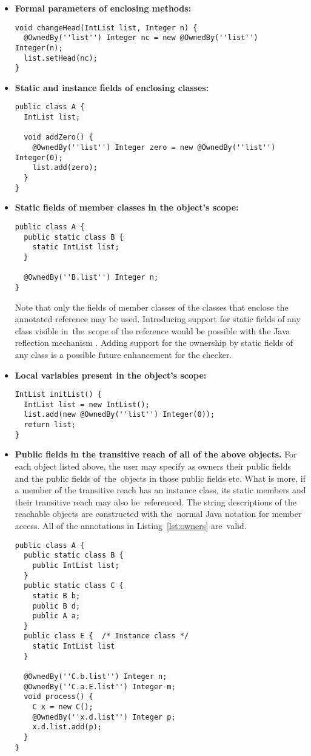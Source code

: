 \documentclass{pracamgr}
\theoremstyle{break}
\theoremstyle{break}
\theoremstyle{break}
\begin{document}
\begin{itemize}
\item \textbf{Formal parameters of enclosing methods:}
  \begin{lstlisting}
void changeHead(IntList list, Integer n) {
  @OwnedBy(''list'') Integer nc = new @OwnedBy(''list'') Integer(n);
  list.setHead(nc);
}
  \end{lstlisting}
\item \textbf{Static and instance fields of enclosing classes:}
  \begin{lstlisting}
public class A {
  IntList list;

  void addZero() {
    @OwnedBy(''list'') Integer zero = new @OwnedBy(''list'') Integer(0);
    list.add(zero);
  }
}
\end{lstlisting}
\item \textbf{Static fields of member classes in the object's scope:}
  \begin{lstlisting}
public class A {
  public static class B {
    static IntList list;
  }

  @OwnedBy(''B.list'') Integer n;
}
\end{lstlisting}
Note that only the fields of member classes of the classes that
enclose the annotated re\-fe\-ren\-ce may be used. Introducing support
for static fields of any class visible in~the~scope of the reference
would be possible with the Java reflection mechanism
\cite{reflection}. Adding support for the ownership by static fields
of any class is a possible future enhancement for the checker.
\item \textbf{Local variables present in the object's scope:}
\begin{lstlisting}
IntList initList() {
  IntList list = new IntList();
  list.add(new @OwnedBy(''list'') Integer(0)); 
  return list;
}
\end{lstlisting}
\item \textbf{Public fields in the transitive reach of all of the
  above objects.} For each object listed above, the user may specify
  as owners their public fields and the public fields of~the~objects
  in those public fields etc. What is more, if a member of the
  transitive reach has an instance class, its static members and their
  transitive reach may also be~referenced. The string descriptions of
  the reachable objects are constructed with the~normal Java notation
  for member access. All of the annotations in
  Listing~\ref{lst:owners} are~valid.
  \begin{lstlisting}[label={lst:owners}, 
      caption={\texttt{@OwnedBy} specifications}]
public class A {
  public static class B {
    public IntList list;
  }
  public static class C {
    static B b;
    public B d;
    public A a;
  }
  public class E {  /* Instance class */
    static IntList list
  }
  
  @OwnedBy(''C.b.list'') Integer n;   
  @OwnedBy(''C.a.E.list'') Integer m; 
  void process() {
    C x = new C();
    @OwnedBy(''x.d.list'') Integer p;
    x.d.list.add(p);
  }  
}
  \end{lstlisting}
\end{itemize}
\end{document}
